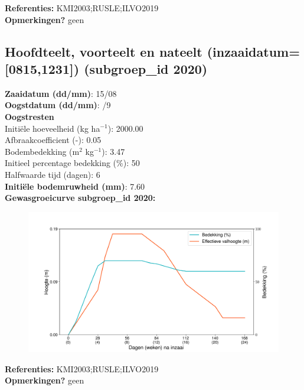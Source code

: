 \documentclass{article}
\begin{document}
  \textbf{Referenties:} KMI2003;RUSLE;ILVO2019 \vspace{0.10cm} \\ 
  \textbf{Opmerkingen?} geen \vspace{0.10cm} \\ 
 \newpage 
 \subsection{Hoofdteelt, voorteelt en nateelt (inzaaidatum=[0815,1231]) (subgroep\_id 2020)} 
  \textbf{Zaaidatum (dd/mm)}: 15/08  \vspace{0.10cm} \\ 
  \textbf{Oogstdatum (dd/mm)}: /9  \vspace{0.10cm} \\ 
  \textbf{Oogstresten} \vspace{0.05cm} \\ 
  \tab Initi\"{e}le hoeveelheid (kg ha$^{-1}$): 2000.00 \vspace{0.05cm} \\ 
  \tab Afbraakcoefficient (-): 0.05 \vspace{0.05cm} \\ 
  \tab Bodembedekking (m$^2$ kg$^{-1}$): 3.47 \vspace{0.05cm} \\ 
  \tab Initieel percentage bedekking (\%): 50 \vspace{0.05cm} \\ 
  \tab Halfwaarde tijd (dagen): 6 \vspace{0.05cm} \\ 
  \textbf{Initi\"{e}le bodemruwheid (mm)}: 7.60 \vspace{0.05cm} \\ 
  \textbf{Gewasgroeicurve subgroep\_id 2020:} 
 \begin{center} \begin{figure}[H] \includegraphics[width=12.5cm]{temp/2020.png} \end{figure} \end{center} 
  \textbf{Referenties:} KMI2003;RUSLE;ILVO2019 \vspace{0.10cm} \\ 
  \textbf{Opmerkingen?} geen \vspace{0.10cm} \\ 
 \newpage 
\end{document}
